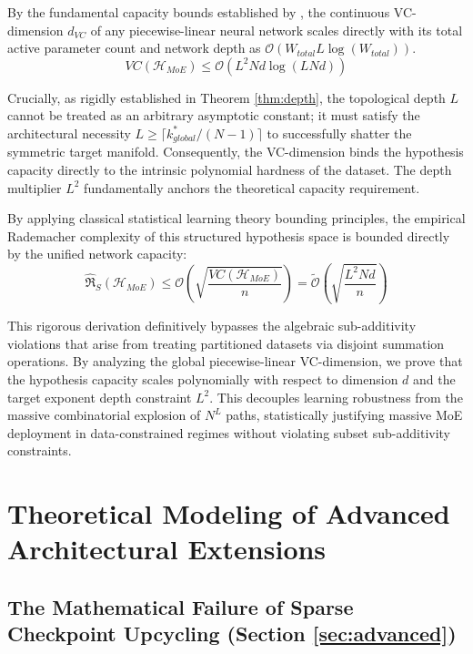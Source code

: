 \documentclass{article}
\newcommand{\1}{\mathbb{I}}
\newcommand{\calO}{\mathcal{O}}
\newcommand{\calH}{\mathcal{H}}
\begin{document}
By the fundamental capacity bounds established by \cite{bartlett2019nearly}, the continuous VC-dimension $d_{VC}$ of any piecewise-linear neural network scales directly with its total active parameter count and network depth as $\calO(W_{total} L \log(W_{total}))$. 
\begin{equation}
    VC(\calH_{MoE}) \le \calO(L^2 N d \log(L N d))
\end{equation}

Crucially, as rigidly established in Theorem \ref{thm:depth}, the topological depth $L$ cannot be treated as an arbitrary asymptotic constant; it must satisfy the architectural necessity $L \ge \lceil k_{global}^* / (N-1) \rceil$ to successfully shatter the symmetric target manifold. Consequently, the VC-dimension binds the hypothesis capacity directly to the intrinsic polynomial hardness of the dataset. The depth multiplier $L^2$ fundamentally anchors the theoretical capacity requirement.

By applying classical statistical learning theory bounding principles, the empirical Rademacher complexity of this structured hypothesis space is bounded directly by the unified network capacity:
\begin{equation}
    \hat{\mathfrak{R}}_S(\calH_{MoE}) \le \calO\left( \sqrt{\frac{VC(\calH_{MoE})}{n}} \right) = \tilde{\calO}\left( \sqrt{\frac{L^2 N d}{n}} \right)
\end{equation}

This rigorous derivation definitively bypasses the algebraic sub-additivity violations that arise from treating partitioned datasets via disjoint summation operations. By analyzing the global piecewise-linear VC-dimension, we prove that the hypothesis capacity scales polynomially with respect to dimension $d$ and the target exponent depth constraint $L^2$. This decouples learning robustness from the massive combinatorial explosion of $N^L$ paths, statistically justifying massive MoE deployment in data-constrained regimes without violating subset sub-additivity constraints.

\section{Theoretical Modeling of Advanced Architectural Extensions}
\label{app:advanced_extensions}

\subsection{The Mathematical Failure of Sparse Checkpoint Upcycling (Section \ref{sec:advanced})}
\label{app:upcycling}
\end{document}

